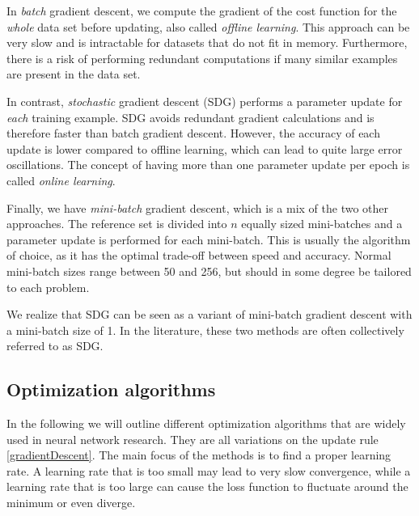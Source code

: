 \documentclass[twoside,english]{uiofysmaster}
\begin{document}
In \textit{batch} gradient descent, 
we compute the gradient of the cost function for the \textit{whole} data set before updating, also called 
\textit{offline learning}. 
This approach can be very slow and is intractable for datasets that do not fit in memory. Furthermore, there is a risk
of performing redundant computations if many similar examples are present in the data set.

In contrast, \textit{stochastic} gradient descent (SDG) performs a parameter update for \textit{each} training example. 
SDG avoids redundant gradient calculations and is therefore faster than batch gradient descent. However, the accuracy 
of each update is lower compared to offline learning, which can lead to quite large error oscillations. The concept of having  
more than one parameter update per epoch is called \textit{online learning}. 

Finally, we have \textit{mini-batch} gradient descent, which is a mix of the two other approaches. The reference set 
is divided into $n$ equally sized mini-batches and a parameter update is performed for each mini-batch. This is usually the
algorithm of choice, as it has the optimal trade-off between speed and accuracy. Normal mini-batch sizes range
between 50 and 256, but should in some degree be tailored to each problem. 

We realize that SDG can be seen as 
a variant of mini-batch gradient descent with a mini-batch size of 1. In the literature, these two methods 
are often collectively referred to as SDG.


\subsection{Optimization algorithms} \label{sec:optimizationAlgorithms}
In the following we will outline different optimization algorithms that are widely used in neural network research. 
They are all variations on the update rule \eqref{gradientDescent}. The main focus of the methods is to find
a proper learning rate. A learning rate that is too small may lead to very slow convergence, while 
a learning rate that is too large can cause the loss function to fluctuate around the minimum or even diverge. 
\end{document}
